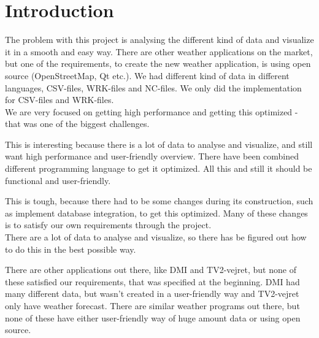 \chapter{Introduction}



The problem with this project is analysing the different kind of data and visualize it in a smooth and easy way. There are other weather applications on the market, but one of the requirements, to create the new weather application, is using open source (OpenStreetMap, Qt etc.). We had different kind of data in different languages, CSV-files, WRK-files and NC-files. We only did the implementation for CSV-files and WRK-files.\\
We are very focused on getting high performance and getting this optimized - that was one of the biggest challenges.

This is interesting because there is a lot of data to analyse and visualize, and still want high performance and user-friendly overview. There have been combined different programming language to get it optimized. All this and still it should be functional and user-friendly.

This is tough, because there had to be some changes during its construction, such as implement database integration, to get this optimized. Many of these changes is to satisfy our own requirements through the project.\\
There are a lot of data to analyse and visualize, so there has be figured out how to do this in the best possible way.

There are other applications out there, like DMI and TV2-vejret, but none of these satisfied our requirements, that was specified at the beginning. DMI had many different data, but wasn't created in a user-friendly way and TV2-vejret only have weather forecast. There are similar weather programs out there, but none of these have either user-friendly way of huge amount data or using open source.

